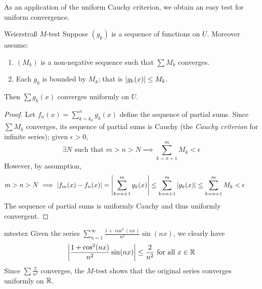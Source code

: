 As an application of the uniform Cauchy criterion, we obtain an easy test for uniform convergence.

\begin{thm}{Weierstraß $M$-test}{}
Suppose $(g_k)$ is a sequence of functions on $U$. Moreover assume:
\begin{enumerate}
  \item $(M_k)$ is a non-negative sequence such that $\sum M_k$ converges.
  \item Each $g_k$ is bounded by $M_k$; that is $\left| g_k(x)\right|\le M_k$.
\end{enumerate}
Then $\sum g_k(x)$ converges uniformly on $U$.
\end{thm}

\begin{proof}
Let $f_n(x)=\sum\limits_{k=k_0}^ng_k(x)$ define the sequence of partial sums. Since $\sum M_k$ converges, its sequence of partial sums is Cauchy (the \emph{Cauchy criterion} for infinite series); given $\epsilon>0$,
\[\exists N\text{ such that }m>n>N\implies \sum_{k=n+1}^m M_k<\epsilon\]
However, by assumption,
\[m>n>N\implies \left| f_m(x)-f_n(x)\right|=\left| \sum_{k=n+1}^mg_k(x)\right| \le \sum_{k=n+1}^m\left| g_k(x)\right| \le\sum_{k=n+1}^mM_k<\epsilon\tag*{\qedhere}\]
The sequence of partial sums is uniformly Cauchy and thus uniformly convergent.
\end{proof}

\begin{example}{}{mtestex}
Given the series $\sum\limits_{n=1}^\infty\frac{1+\cos^2(nx)}{n^2}\sin(nx)$, we clearly have
\[\left| \frac{1+\cos^2(nx)}{n^2}\sin(nx)\right|\le\frac 2{n^2}\text{ for all }x\in\mathbb{R}\]
Since $\sum\frac 2{n^2}$ converges, the $M$-test shows that the original series converges uniformly on $\mathbb{R}$.
\end{example}

\goodbreak

